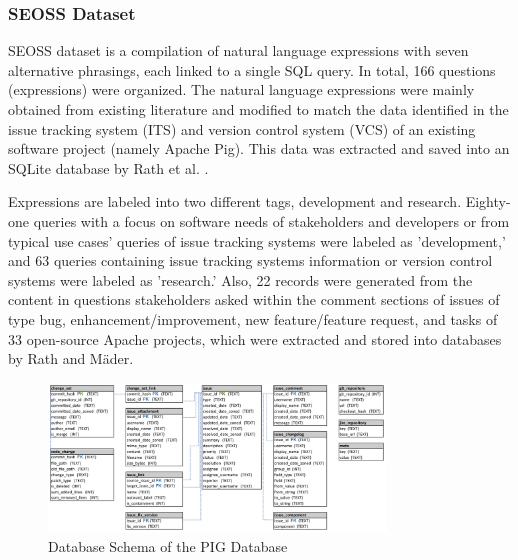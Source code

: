 \subsubsection{SEOSS Dataset}

SEOSS dataset is a compilation of natural language expressions with seven alternative phrasings, each linked to a single SQL query. In total, 166 questions (expressions) were organized. The natural language expressions were mainly obtained from existing literature and modified to match the data identified in the issue tracking system (ITS) and version control system (VCS) of an existing software project (namely Apache Pig). This data was extracted and saved into an SQLite database by Rath et al. \cite{RATH2019104005}.

Expressions are labeled into two different tags, development and research. Eighty-one queries with a focus on software needs of stakeholders and developers or from typical use cases' queries of issue tracking systems were labeled as 'development,' and 63 queries containing issue tracking systems information or version control systems were labeled as 'research.' Also, 22 records were generated from the content in questions stakeholders asked within the comment sections of issues of type bug, enhancement/improvement, new feature/feature request, and tasks of 33 open-source Apache projects, which were extracted and stored into databases by Rath and Mäder\cite{RATH2019104005}.

\begin{figure}[htb]
    \centering
    \includegraphics[width=0.8\textwidth]{pics/seoss/pig.png}
    \caption{Database Schema of the PIG Database \cite{TOMOVA2022108211}}
    \label{fig:SESS}
\end{figure}


